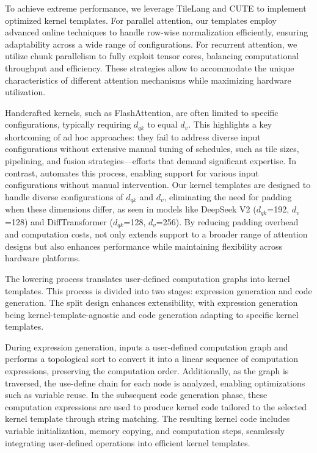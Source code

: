 To achieve extreme performance, we leverage TileLang\cite{tilelang} and CUTE\cite{nvidia2024cutlass} to implement optimized kernel templates. For parallel attention, our templates employ advanced online techniques to handle row-wise normalization efficiently, ensuring adaptability across a wide range of configurations. For recurrent attention, we utilize chunk parallelism to fully exploit tensor cores, balancing computational throughput and efficiency. These strategies allow \oursys{} to accommodate the unique characteristics of different attention mechanisms while maximizing hardware utilization.

Handcrafted kernels, such as FlashAttention, are often limited to specific configurations, typically requiring \texttt{$d_{qk}$} to equal \texttt{$d_v$}. This highlights a key shortcoming of ad hoc approaches: they fail to address diverse input configurations without extensive manual tuning of schedules, such as tile sizes, pipelining, and fusion strategies—efforts that demand significant expertise. In contrast, \oursys{} automates this process, enabling support for various input configurations without manual intervention. Our kernel templates are designed to handle diverse configurations of \texttt{$d_{qk}$} and \texttt{$d_v$}, eliminating the need for padding when these dimensions differ, as seen in models like DeepSeek V2 (\texttt{$d_{qk}$}=192, \texttt{$d_v$}=128)\cite{deepseekai2024deepseekv2strongeconomicalefficient} and DiffTransformer (\texttt{$d_{qk}$}=128, \texttt{$d_v$}=256)\cite{ye2024differentialtransformer}. By reducing padding overhead and computation costs, \oursys{} not only extends support to a broader range of attention designs but also enhances performance while maintaining flexibility across hardware platforms.

 The lowering process translates user-defined computation graphs into kernel templates. This process is divided into two stages: expression generation and code generation. The split design enhances extensibility, with expression generation being kernel-template-agnostic and code generation adapting to specific kernel templates.

During expression generation, \oursys{} inputs a user-defined computation graph and performs a topological sort to convert it into a linear sequence of computation expressions, preserving the computation order. Additionally, as the graph is traversed, the use-define chain for each node is analyzed, enabling optimizations such as variable reuse. In the subsequent code generation phase, these computation expressions are used to produce kernel code tailored to the selected kernel template through string matching. The resulting kernel code includes variable initialization, memory copying, and computation steps, seamlessly integrating user-defined operations into efficient kernel templates.


